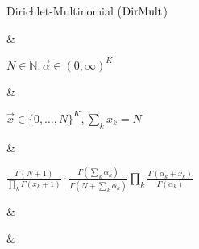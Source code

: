 Dirichlet-Multinomial ($\operatorname{DirMult}$)

&

$N \in \mathbb N, \vec \alpha \in (0, \infty)^K$

& 

$\vec x \in \{0, \dotsc, N\}^K, \sum_k x_k = N$

&

\(\displaystyle
	\frac{\Gamma(N + 1)}{\prod_k \Gamma(x_k + 1)} \cdot \frac{\Gamma\left(\sum_k \alpha_k\right)}{\Gamma\left(N + \sum_k \alpha_k\right)} \prod_k \frac{\Gamma(\alpha_k + x_k)}{\Gamma(\alpha_k)}
\)

& 



&

